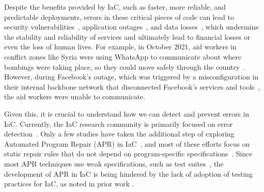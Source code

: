 \documentclass[sigconf,nonacm]{acmart}
\begin{document}
Despite the benefits provided by IaC, such as faster, more reliable, and predictable deployments, errors in these critical pieces of code can lead to security vulnerabilities~\cite{rahman2019seven,rahman2021security,reis2022leveraging,saavedra2022glitch,saavedra2023polyglot,opdebeeck2023control}, application outages~\cite{gitlab_outage_2014,stack_exchange_outage_2014,reddit_outage_2016,incident_resolution_honeycomb_2021,rust_outage_2023}, and data losses~\cite{wikimedia_dataloss_2016}, which undermine the stability and reliability of %
services and ultimately lead to financial losses or even the loss of human lives. For example, in October 2021, aid workers in conflict zones like Syria were using WhatsApp to communicate about where bombings were taking place, so they could move safely through the country~\cite{facebook_down_2021}. However, during Facebook’s outage, which was triggered by a misconfiguration in their internal backbone network that disconnected Facebook's services and tools~\cite{Janardhan_2021}, the aid workers were unable to communicate.

Given this, it is crucial to understand how we can detect and prevent errors in IaC. Currently, the IaC research community is primarily focused on error detection~\cite{saavedra2022glitch,saavedra2023polyglot,rahman2021security,reis2022leveraging,hassan2024state,begoug2024fine,sotiropoulos2020practical,opdebeeck2022smelly,rahman2023security,lepiller2021analyzing,schwarz2018code,sharma2016does,bessghaier2024prevalence,opdebeeck2023control,zerouali2023helm}. Only a few studies have taken the additional step of exploring Automated Program Repair (APR) in IaC~\cite{weiss2017tortoise,hassan2018rudsea}, and most of these efforts focus on static repair rules that do not depend on program-specific specifications~\cite{bui2023dockercleaner,henkel2021shipwright,durieux2023parfum}. Since most APR techniques use weak specifications, such as test suites~\cite{goues2019automated,repair-living-review, monperrus2018automatic}, 
the development of APR in IaC is being hindered by the lack of adoption of testing practices for IaC, 
as noted in prior work
\cite{guerriero2019adoption,sokolowski2024automated,rahman2019systematic,sokolowski2024pipr}.
\end{document}

